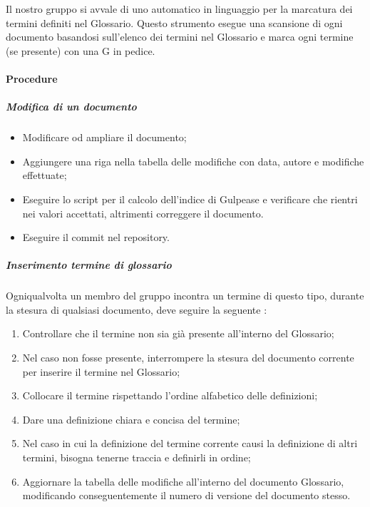 Il nostro gruppo si avvale di uno  automatico in linguaggio  per la marcatura dei termini definiti nel Glossario. Questo strumento esegue una scansione di ogni documento basandosi sull'elenco dei termini nel Glossario e marca ogni termine (se presente) con una G in pedice.



\paragraph{Procedure}

\subparagraph{Modifica di un documento}
\begin{itemize}
\item Modificare od ampliare il documento;
\item Aggiungere una riga nella tabella delle modifiche con data, autore e modifiche effettuate;
\item Eseguire lo script per il calcolo dell'indice di Gulpease e verificare che rientri nei valori accettati, altrimenti correggere il documento.
\item Eseguire il commit nel repository. 
\end{itemize}

\subparagraph{Inserimento termine di glossario}
Ogniqualvolta un membro del gruppo incontra un termine di questo tipo, durante la stesura di qualsiasi documento, deve seguire la seguente :
\begin{enumerate}
\item Controllare che il termine non sia già presente all'interno del Glossario;
\item Nel caso non fosse presente, interrompere la stesura del documento corrente per inserire il termine nel Glossario;
\item Collocare il termine rispettando l'ordine alfabetico delle definizioni;
\item Dare una definizione chiara e concisa del termine;
\item Nel caso in cui la definizione del termine corrente causi la definizione di altri termini, bisogna tenerne traccia e definirli in ordine;
\item Aggiornare la tabella delle modifiche all'interno del documento Glossario, modificando conseguentemente il numero di versione del documento stesso.
\end{enumerate}

